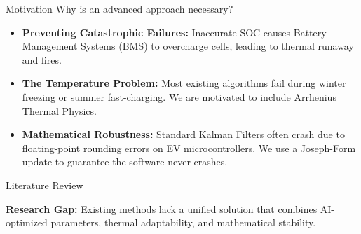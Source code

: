 \documentclass[aspectratio=169]{beamer}
\begin{document}
\begin{frame}{Motivation}
    Why is an advanced approach necessary?
    \begin{itemize}
        \item \textbf{Preventing Catastrophic Failures:} Inaccurate SOC causes Battery Management Systems (BMS) to overcharge cells, leading to thermal runaway and fires.
        \item \textbf{The Temperature Problem:} Most existing algorithms fail during winter freezing or summer fast-charging. We are motivated to include Arrhenius Thermal Physics.
        \item \textbf{Mathematical Robustness:} Standard Kalman Filters often crash due to floating-point rounding errors on EV microcontrollers. We use a Joseph-Form update to guarantee the software never crashes.
    \end{itemize}
\end{frame}

\begin{frame}{Literature Review}
    \begin{table}[]
        \centering
    \end{table}
    \vspace{0.3cm}
    \textbf{Research Gap:} Existing methods lack a unified solution that combines AI-optimized parameters, thermal adaptability, and mathematical stability.
\end{frame}
\end{document}
